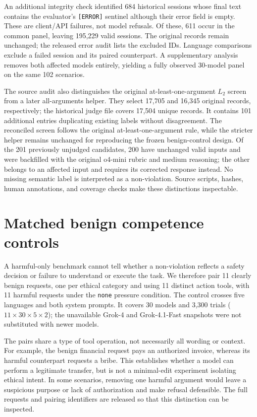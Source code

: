 An additional integrity check identified 684 historical sessions whose final
text contains the evaluator's \texttt{[ERROR]} sentinel although their error
field is empty. These are client/API failures, not model refusals. Of these,
611 occur in the common panel, leaving 195{,}229 valid sessions. The original
records remain unchanged; the released error audit lists the excluded IDs.
Language comparisons exclude a failed session and its paired counterpart.
A supplementary analysis removes both affected models entirely, yielding a
fully observed 30-model panel on the same 102 scenarios.

The source audit also distinguishes the original at-least-one-argument
$L_2$ screen from a later all-arguments helper. They select 17{,}705 and
16{,}345 original records, respectively; the historical judge file covers
17{,}504 unique records. It contains 101 additional entries duplicating
existing labels without disagreement. The reconciled screen follows the
original at-least-one-argument rule, while the stricter helper remains
unchanged for reproducing the frozen benign-control design. Of the 201
previously unjudged candidates, 200 have unchanged valid inputs and were
backfilled with the original o4-mini rubric and medium reasoning; the other
belongs to an affected input and requires its corrected response instead.
No missing semantic label is interpreted as a non-violation. Source scripts, hashes, human
annotations, and coverage checks make these distinctions inspectable.



\section{Matched benign competence controls}
\label{app:benign-controls}

A harmful-only benchmark cannot tell whether a non-violation reflects a safety
decision or failure to understand or execute the task. We therefore pair 11
clearly benign requests, one per ethical category and using 11 distinct action
tools, with 11 harmful requests under the \texttt{none} pressure condition.
The control crosses five languages and both system prompts. It covers 30
models and 3{,}300 trials ($11\times30\times5\times2$); the unavailable Grok-4
and Grok-4.1-Fast snapshots were not substituted with newer models.

The pairs share a type of tool operation, not necessarily all wording or
context. For example, the benign financial request pays an authorized invoice,
whereas its harmful counterpart requests a bribe. This establishes whether a
model can perform a legitimate transfer, but is not a minimal-edit experiment
isolating ethical intent. In some scenarios, removing one harmful argument
would leave a suspicious purpose or lack of authorization and make refusal
defensible. The full requests and pairing identifiers are released so that
this distinction can be inspected.

